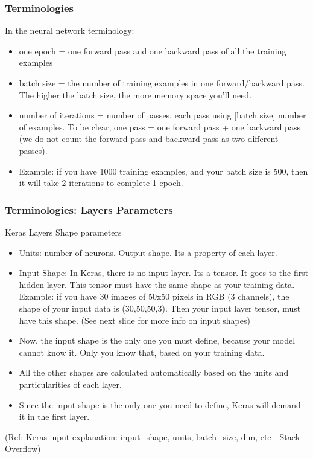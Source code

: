 
\begin{frame}[fragile] \frametitle{Terminologies}

In the neural network terminology:

\begin{itemize}
\item one epoch = one forward pass and one backward pass of all the training examples
\item batch size = the number of training examples in one forward/backward pass. The higher the batch size, the more memory space you'll need.
\item number of iterations = number of passes, each pass using [batch size] number of examples. To be clear, one pass = one forward pass + one backward pass (we do not count the forward pass and backward pass as two different passes).
\item Example: if you have 1000 training examples, and your batch size is 500, then it will take 2 iterations to complete 1 epoch.
\end{itemize}
\end{frame}

\begin{frame}[fragile] \frametitle{Terminologies: Layers Parameters}

Keras Layers Shape parameters

\begin{itemize}
\item Units: number of neurons. Output shape. Its a property of each layer.
\item Input Shape: In Keras, there is no input layer. Its a tensor. It goes to the first hidden layer. This tensor must have the same shape as your training data. Example: if you have 30 images of 50x50 pixels in RGB (3 channels), the shape of your input data is (30,50,50,3). Then your input layer tensor, must have this shape. (See next slide for more info on input shapes)
\item Now, the input shape is the only one you must define, because your model cannot know it. Only you know that, based on your training data.

\item All the other shapes are calculated automatically based on the units and particularities of each layer.
\item Since the input shape is the only one you need to define, Keras will demand it in the first layer.
\end{itemize}

\tiny{(Ref: Keras input explanation: input\_shape, units, batch\_size, dim, etc - Stack Overflow)}
\end{frame}

